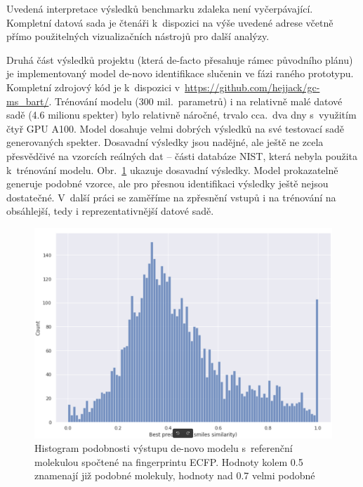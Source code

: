 \documentclass[a4paper,11pt]{article}
\begin{document}
Uvedená interpretace výsledků benchmarku zdaleka není vyčerpávající.
Kompletní datová sada je čtenáři k~dispozici na výše uvedené adrese včetně
přímo použitelných vizualizačních nástrojů pro další analýzy.


Druhá část výsledků projektu (která de-facto přesahuje rámec původního plánu) 
je implementovaný model de-novo identifikace slučenin ve fázi raného prototypu.
Kompletní zdrojový kód je k~dispozici v~\url{https://github.com/hejjack/gc-ms_bart/}.
Trénování modelu (300 mil.\ parametrů) i na relativně malé datové sadě (4.6 milionu spekter) bylo relativně náročné,
trvalo cca.\ dva dny s~využitím čtyř GPU A100.
Model dosahuje velmi dobrých výsledků na své testovací sadě generovaných spekter.
Dosavadní výsledky jsou nadějné, ale ještě ne zcela přesvědčivé na vzorcích reálných dat -- části 
databáze NIST, která nebyla použita k~trénování modelu. 
Obr.~\ref{f:bart-result} ukazuje dosavadní výsledky.
Model prokazatelně generuje podobné vzorce, ale pro přesnou identifikaci výsledky ještě 
nejsou dostatečné. 
V~další práci se zaměříme na zpřesnění vstupů i na trénování na obsáhlejší, tedy i reprezentativnější
datové sadě.

\begin{figure}
\begin{center}
\includegraphics[width=.8\hsize]{results3_nist_on_nist}
\caption{Histogram podobnosti výstupu de-novo modelu s~referenční molekulou spočtené na fingerprintu ECFP.
Hodnoty kolem 0.5 znamenají již podobné molekuly, hodnoty nad 0.7 velmi podobné}
\label{f:bart-result}
\end{center}
\end{figure}

\end{document}
